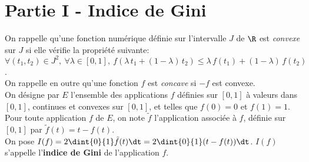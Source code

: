 \documentclass[11pt]{article}%
\begin{document}
\section*{Partie I - Indice de Gini}

\noindent
On rappelle qu'une fonction numérique définie sur l'intervalle $J$ de 
$\R$ est \emph{convexe} sur $J$ si elle vérifie la propriété suivante: 
$\forall (t_1,t_2) \in J^2, \ \forall \lambda \in [0,1], \ f( \lambda 
\, t_1 + (1- \lambda) \, t_2) \leq \lambda \, f(t_1) + (1-\lambda ) \, 
f(t_2)$. \\
On rappelle en outre qu'une fonction $f$ est \emph{concave} si $-f$ est 
convexe.\\
On désigne par $E$ l'ensemble des applications $f$ définies sur $[0,1]$ 
à valeurs dans $[0,1]$, continues et convexes sur $[0,1]$, et telles 
que 
$f(0)=0$ et $f(1)=1$. Pour toute application $f$ de $E$, on note 
$\tilde{f}$ l'application associée à $f$, définie sur $[0,1]$ par 
$\tilde{f}(t)=t-f(t)$. \\[.1cm]
On pose $I(f)= 2\dint{0}{1} \tilde{f}(t) \dt= 
2\dint{0}{1}(t-f(t)) \dt$. $I(f)$ s'appelle l'\textbf{indice de Gini} 
de l'application $f$. 
\end{document}
